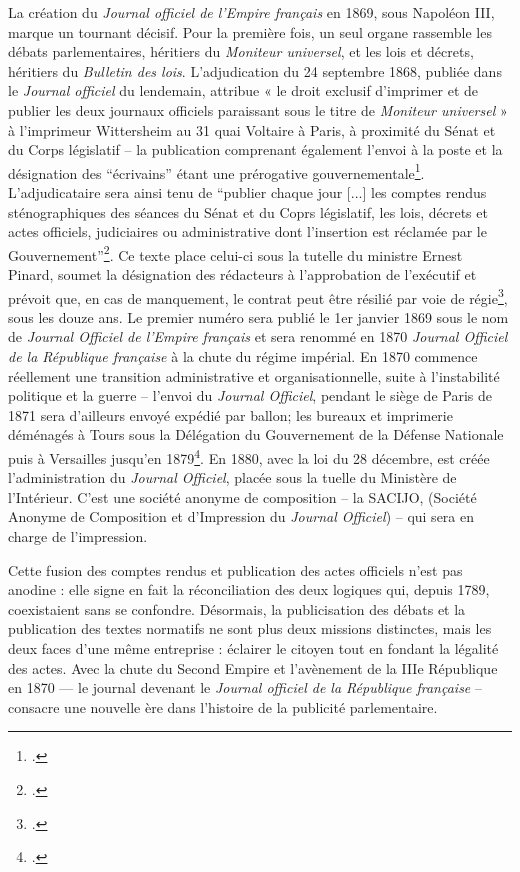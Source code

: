 La création du \emph{Journal officiel de l’Empire français} en 1869, sous Napoléon III, marque un tournant décisif. Pour la première fois, un seul organe rassemble les débats parlementaires, héritiers du \emph{Moniteur universel}, et les lois et décrets, héritiers du \emph{Bulletin des lois}. L’adjudication du 24 septembre 1868, publiée dans le \emph{Journal officiel} du lendemain, attribue « le droit exclusif d’imprimer et de publier les deux journaux officiels paraissant sous le titre de \emph{Moniteur universel} » à l’imprimeur Wittersheim au 31 quai Voltaire à Paris, à proximité du Sénat et du Corps législatif -- la publication comprenant également l'envoi à la poste et la désignation des \enquote{écrivains} étant une prérogative gouvernementale\footcite[][]{cote1}. L'adjudicataire sera ainsi tenu de \enquote{publier chaque jour [...] les comptes rendus sténographiques des séances du Sénat et du Coprs législatif, les lois, décrets et actes officiels, judiciaires ou administrative dont l'insertion est réclamée par le Gouvernement}\footcite[][]{cote1}. Ce texte place celui-ci sous la tutelle du ministre Ernest Pinard, soumet la désignation des rédacteurs à l’approbation de l’exécutif et prévoit que, en cas de manquement, le contrat peut être résilié par voie de régie\footcite[][]{cote1}, sous les douze ans. Le premier numéro sera publié le 1er janvier 1869 sous le nom de \emph{Journal Officiel de l'Empire français} et sera renommé en 1870 \emph{Journal Officiel de la République française} à la chute du régime impérial. En 1870 commence réellement une transition administrative et organisationnelle, suite à l'instabilité politique et la guerre -- l'envoi du \emph{Journal Officiel}, pendant le siège de Paris de 1871 sera d'ailleurs envoyé expédié par ballon; les bureaux et imprimerie déménagés à Tours sous la Délégation du Gouvernement de la Défense Nationale puis à Versailles jusqu'en 1879\footcite[][]{cote1}. En 1880, avec la loi du 28 décembre, est créée l'administration du \emph{Journal Officiel}, placée sous la tuelle du Ministère de l'Intérieur. C'est une société anonyme de composition -- la SACIJO, (Société Anonyme de Composition et d'Impression du \emph{Journal Officiel}) -- qui sera en charge de l'impression.

Cette fusion des comptes rendus et publication des actes officiels n’est pas anodine : elle signe en fait la réconciliation des deux logiques qui, depuis 1789, coexistaient sans se confondre. Désormais, la publicisation des débats et la publication des textes normatifs ne sont plus deux missions distinctes, mais les deux faces d’une même entreprise : éclairer le citoyen tout en fondant la légalité des actes. Avec la chute du Second Empire et l’avènement de la IIIe République en 1870 --- le journal devenant le \emph{Journal officiel de la République française} -- consacre une nouvelle ère dans l’histoire de la publicité parlementaire. 

